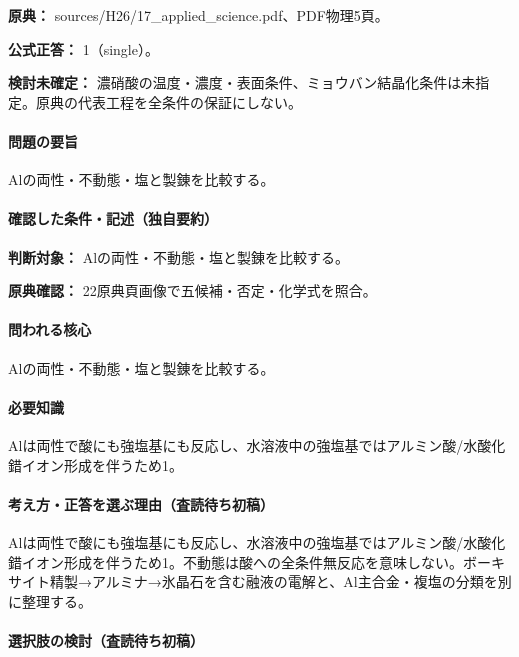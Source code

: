 \noindent\textbf{原典：} sources/H26/17\_applied\_science.pdf、PDF物理5頁。

\textbf{公式正答：} 1（single）。

\par\textbf{検討未確定：} 濃硝酸の温度・濃度・表面条件、ミョウバン結晶化条件は未指定。原典の代表工程を全条件の保証にしない。

\paragraph{問題の要旨} Alの両性・不動態・塩と製錬を比較する。

\paragraph{確認した条件・記述（独自要約）}\mbox{}\par

\noindent\textbf{判断対象：} Alの両性・不動態・塩と製錬を比較する。\par

\noindent\textbf{原典確認：} 22原典頁画像で五候補・否定・化学式を照合。\par

\paragraph{問われる核心} Alの両性・不動態・塩と製錬を比較する。

\paragraph{必要知識} Alは両性で酸にも強塩基にも反応し、水溶液中の強塩基ではアルミン酸/水酸化錯イオン形成を伴うため1。

\paragraph{考え方・正答を選ぶ理由（査読待ち初稿）} Alは両性で酸にも強塩基にも反応し、水溶液中の強塩基ではアルミン酸/水酸化錯イオン形成を伴うため1。不動態は酸への全条件無反応を意味しない。ボーキサイト精製→アルミナ→氷晶石を含む融液の電解と、Al主合金・複塩の分類を別に整理する。

\paragraph{選択肢の検討（査読待ち初稿）}\mbox{}\par

